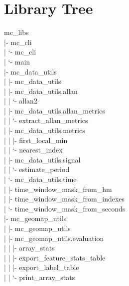 \documentclass[11pt]{article}
\begin{document}
\section{Library Tree}
\begingroup
\ttfamily
\textcolor{TreeLevelZero}{mc\_libs}\\
\textcolor{TreeLevelOne}{|- mc\_cli}\\
\textcolor{TreeLevelTwo}{|  `- mc\_cli}\\
\textcolor{TreeLevelThree}{|     `- main}\\
\textcolor{TreeLevelOne}{|- mc\_data\_utils}\\
\textcolor{TreeLevelTwo}{|  |- mc\_data\_utils}\\
\textcolor{TreeLevelTwo}{|  |- mc\_data\_utils.allan}\\
\textcolor{TreeLevelThree}{|  |  `- allan2}\\
\textcolor{TreeLevelTwo}{|  |- mc\_data\_utils.allan\_metrics}\\
\textcolor{TreeLevelThree}{|  |  `- extract\_allan\_metrics}\\
\textcolor{TreeLevelTwo}{|  |- mc\_data\_utils.metrics}\\
\textcolor{TreeLevelThree}{|  |  |- first\_local\_min}\\
\textcolor{TreeLevelThree}{|  |  `- nearest\_index}\\
\textcolor{TreeLevelTwo}{|  |- mc\_data\_utils.signal}\\
\textcolor{TreeLevelThree}{|  |  `- estimate\_period}\\
\textcolor{TreeLevelTwo}{|  `- mc\_data\_utils.time}\\
\textcolor{TreeLevelThree}{|     |- time\_window\_mask\_from\_hm}\\
\textcolor{TreeLevelThree}{|     |- time\_window\_mask\_from\_indexes}\\
\textcolor{TreeLevelThree}{|     `- time\_window\_mask\_from\_seconds}\\
\textcolor{TreeLevelOne}{|- mc\_geomap\_utils}\\
\textcolor{TreeLevelTwo}{|  |- mc\_geomap\_utils}\\
\textcolor{TreeLevelTwo}{|  |- mc\_geomap\_utils.evaluation}\\
\textcolor{TreeLevelThree}{|  |  |- array\_stats}\\
\textcolor{TreeLevelThree}{|  |  |- export\_feature\_stats\_table}\\
\textcolor{TreeLevelThree}{|  |  |- export\_label\_table}\\
\textcolor{TreeLevelThree}{|  |  `- print\_array\_stats}\\
\end{document}

